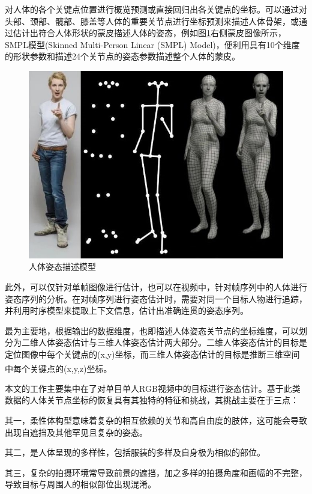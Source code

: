 对人体的各个关键点位置进行概览预测或直接回归出各关键点的坐标。可以通过对头部、颈部、髋部、膝盖等人体的重要关节点进行坐标预测来描述人体骨架，或通过估计出符合人体形状的蒙皮描述人体的姿态，例如图\ref{fig:f4}右侧蒙皮图像所示，SMPL模型(Skinned Multi-Person Linear (SMPL) Model)，便利用具有10个维度的形状参数和描述24个关节点的姿态参数描述整个人体的蒙皮。

\begin{figure}[h]
	\centering
	\includegraphics[scale=0.6]{figures/4.jpg}
	\caption{人体姿态描述模型}
	\label{fig:f4}
\end{figure}

此外，可以仅针对单帧图像进行估计，也可以在视频中，针对帧序列中的人体进行姿态序列的分析。在对帧序列进行姿态估计时，需要对同一个目标人物进行追踪，并利用时序模型来提取上下文信息，估计出准确连贯的姿态序列。

最为主要地，根据输出的数据维度，也即描述人体姿态关节点的坐标维度，可以划分为二维人体姿态估计与三维人体姿态估计两大部分。二维人体姿态估计的目标是定位图像中每个关键点的(x,y)坐标，而三维人体姿态估计的目标是推断三维空间中每个关键点的(x,y,z)\textsuperscript{\cite{p9}}坐标。

本文的工作主要集中在了对单目单人RGB视频中的目标进行姿态估计。基于此类数据的人体关节点坐标的恢复具有其独特的特征和挑战，其挑战主要在于三点：

其一，柔性体构型意味着复杂的相互依赖的关节和高自由度的肢体，这可能会导致出现自遮挡及其他罕见且复杂的姿态。

其二，是人体呈现的多样性，包括服装的多样及自身极为相似的部位。

其三，复杂的拍摄环境常导致前景的遮挡，加之多样的拍摄角度和画幅的不完整，导致目标与周围人的相似部位出现混淆。




